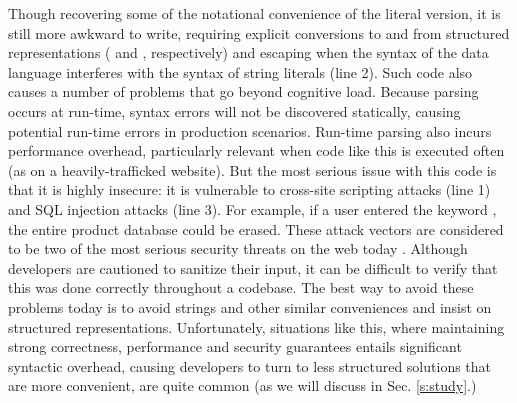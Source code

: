 Though recovering some of the notational convenience of the literal version, it is still more awkward to write, requiring explicit conversions to and from structured representations ( and , respectively) and escaping when the syntax of the data language interferes with the syntax of string literals (line 2). Such code also causes a number of problems that go beyond cognitive load. Because parsing occurs at run-time, syntax errors will not be discovered statically, causing potential run-time errors  in production scenarios. Run-time parsing also incurs performance overhead, particularly relevant when code like this is executed often (as on a heavily-trafficked website). But the most serious issue with this code is that it is highly insecure: it is vulnerable to cross-site scripting attacks (line 1) and SQL injection attacks (line 3). For example, if a user entered the keyword , the entire product database could be erased. These attack vectors are considered to be two of the most serious security threats on the web today \cite{owasp2013}. Although developers are cautioned to sanitize their input, it can be difficult to verify that this was done correctly throughout a codebase. The best way to avoid these problems today is to avoid strings and other similar conveniences and insist on structured representations. Unfortunately, situations like this, where maintaining strong correctness, performance and security guarantees entails significant syntactic overhead, causing developers to turn to less structured solutions that are more convenient, are quite common (as we will discuss in Sec. \ref{s:study}.)


